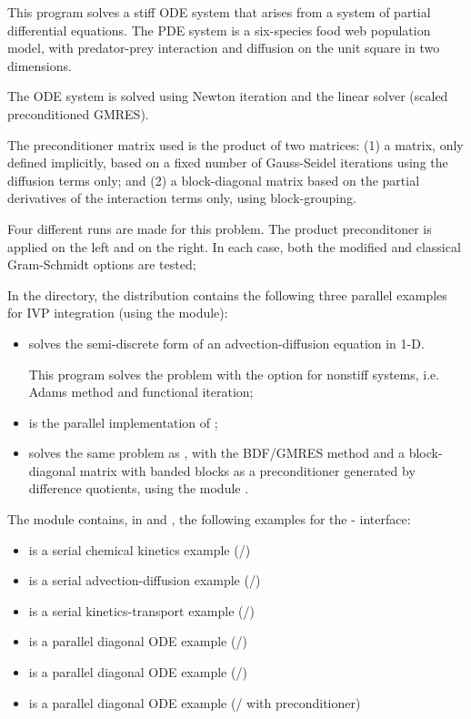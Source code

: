 \begin{itemize}
  This program solves a stiff ODE system that arises from a system     
  of partial differential equations.  The PDE system is a six-species
  food web population model, with predator-prey interaction and diffusion 
  on the unit square in two dimensions.

  The ODE system is solved using Newton iteration and the      
  {\cvspgmr} linear solver (scaled preconditioned GMRES).                  
                                                                        
  The preconditioner matrix used is the product of two matrices:         
  (1) a matrix, only defined implicitly, based on a fixed number of     
  Gauss-Seidel iterations using the diffusion terms only; and               
  (2) a block-diagonal matrix based on the partial derivatives of the   
  interaction terms only, using block-grouping.                          
                                                                        
  Four different runs are made for this problem.                        
  The product preconditoner is applied on the left and on the right.    
  In each case, both the modified and classical Gram-Schmidt options    
  are tested;
\end{itemize}

\noindent In the  directory, the {\cvode} 
distribution contains the following three parallel examples for
IVP integration (using the {\nvecp} module):
\begin{itemize}
\item {}
  solves the semi-discrete form of an advection-diffusion equation in 1-D.

  This program solves the problem with the option for nonstiff systems,
  i.e. Adams method and functional iteration;
\item {}
  is the parallel implementation of ;
\item {}
  solves the same problem as , with the BDF/GMRES method 
  and a block-diagonal matrix with banded blocks as a preconditioner 
  generated by difference quotients, using the module {\cvbbdpre}.
\end{itemize}

\noindent The {\fcvode} module contains, in 
 and , the following 
examples for the {\F}-{\C} interface:
\begin{itemize}
\item {} is a serial chemical kinetics example (/{\dense})
\item {} is a serial advection-diffusion example (/{\band})
\item {} is a serial kinetics-transport example (/{\spgmr})
\item {} is a parallel diagonal ODE example (/)
\item {} is a parallel diagonal ODE example (/{\spgmr})
\item {} is a parallel diagonal ODE example (/{\spgmr} with 
  {\fcvbbd} preconditioner)
\end{itemize}